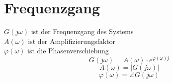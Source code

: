 \section{Frequenzgang}

$G(j\omega)$ ist der Frequenzgang des Systems \\
$A(\omega) $ ist der Amplifizierungsfaktor\\
$\varphi(\omega) $ ist die Phasenverschiebung
\[ \boxed{G(j \omega) = A(\omega) \cdot e^{\varphi(\omega)j}}\]
\[ A(\omega) = |G(j\omega)| \]
\[ \varphi(\omega) = \angle G(j \omega) \]

